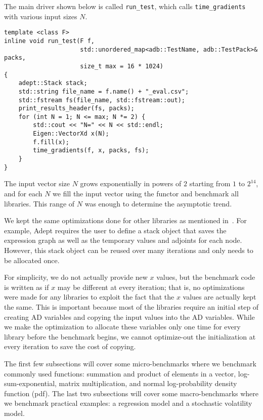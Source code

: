 The main driver shown below is called \verb|run_test|, which calls
\verb|time_gradients| with various input sizes $N$.
\begin{lstlisting}[style=customcpp]
template <class F>
inline void run_test(F f, 
                     std::unordered_map<adb::TestName, adb::TestPack>& packs,
                     size_t max = 16 * 1024) 
{
    adept::Stack stack;
    std::string file_name = f.name() + "_eval.csv";
    std::fstream fs(file_name, std::fstream::out);
    print_results_header(fs, packs);
    for (int N = 1; N <= max; N *= 2) {
        std::cout << "N=" << N << std::endl;
        Eigen::VectorXd x(N);
        f.fill(x);
        time_gradients(f, x, packs, fs);
    }
}
\end{lstlisting}
\fi
The input vector size $N$ grows exponentially in powers of $ 2$ starting from $ 1$ to
$2^{14}$, and for each $N$ we fill the input vector using the functor and benchmark all libraries.
This range of $N$ was enough to determine the asymptotic trend.

We kept the same optimizations done for other libraries as mentioned in~\cite{carpenter:2015}.
For example, Adept requires the user to define a stack object that saves the 
expression graph as well as the temporary values and adjoints for each node.
However, this stack object can be reused over many iterations and only needs to be allocated once.

For simplicity, we do not actually provide new $x$ values, but the benchmark code
is written as if $x$ may be different at every iteration; that is,
no optimizations were made for any libraries to exploit the fact that 
the $x$ values are actually kept the same.
This is important because most of the libraries require an initial step of creating AD variables
and copying the input values into the AD variables.
While we make the optimization to allocate these variables only one time for every library before the benchmark begins,
we cannot optimize-out the initialization
at every iteration to save the cost of copying.

The first few subsections will cover some micro-benchmarks where we benchmark commonly used functions: 
summation and product of elements in a vector, 
log-sum-exponential, 
matrix multiplication, 
and normal log-probability density function (pdf).
The last two subsections will cover some macro-benchmarks where we benchmark practical examples: 
a regression model and a stochastic volatility model.












